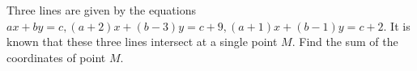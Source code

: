 Three lines are given by the equations $ax+by=c, (a+2)x+(b-3)y=c+9, (a+1)x+(b-1)y=c+2$. It is known that these three lines intersect at a single point $M$. Find the sum of the coordinates of point $M$.
